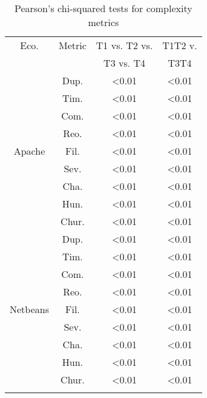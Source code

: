 
\begin{table}[]
\centering
\small
\caption{Pearson's chi-squared tests for complexity metrics}
\label{tab:chi-rq2}
\begin{tabular}{cccc}
Eco. & Metric & T1 vs. T2 vs.   & T1T2 v.  \\
          &     &  T3 vs. T4 & T3T4  \\ \hline \rowcolor{gray!25}
          & Dup.   & \textless0.01         & \textless0.01         \\  \rowcolor{gray!25}
          & Tim.   & \textless0.01         & \textless0.01         \\  \rowcolor{gray!25}
          & Com.   & \textless0.01         & \textless0.01         \\  \rowcolor{gray!25}
          & Reo.   & \textless0.01         & \textless0.01         \\  \rowcolor{gray!25}
Apache    & Fil.   & \textless0.01         & \textless0.01         \\  \rowcolor{gray!25}
          & Sev.   & \textless0.01         & \textless0.01         \\  \rowcolor{gray!25}
          & Cha.   & \textless0.01         & \textless0.01         \\  \rowcolor{gray!25}
          & Hun.   & \textless0.01         & \textless0.01         \\  \rowcolor{gray!25}
          & Chur.  & \textless0.01         & \textless0.01         \\
          & Dup.   & \textless0.01         & \textless0.01         \\
          & Tim.   & \textless0.01         & \textless0.01         \\
          & Com.   & \textless0.01         & \textless0.01         \\
          & Reo.   & \textless0.01         & \textless0.01         \\
Netbeans  & Fil.   & \textless0.01         & \textless0.01         \\
          & Sev.   & \textless0.01         & \textless0.01         \\
          & Cha.   & \textless0.01         & \textless0.01         \\
          & Hun.   & \textless0.01         & \textless0.01         \\
          & Chur.  & \textless0.01         & \textless0.01         \\  \rowcolor{gray!25}

\end{tabular}
\end{table}
